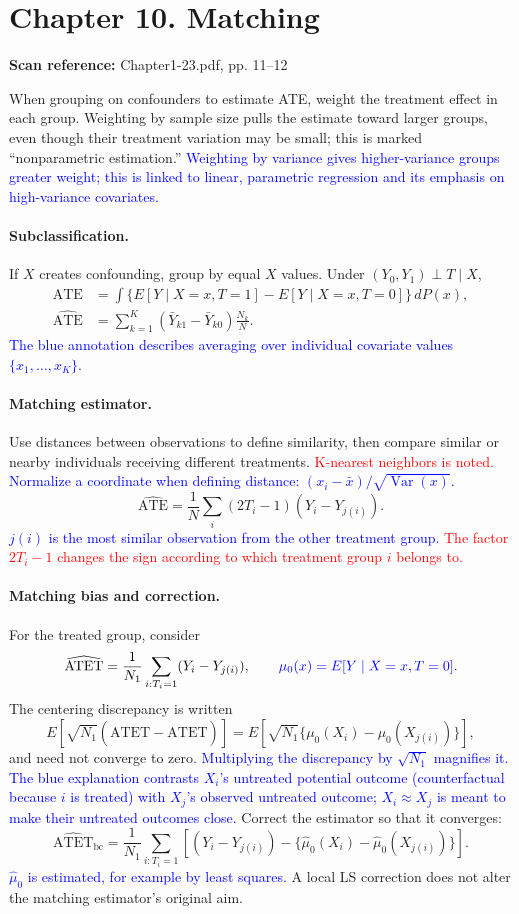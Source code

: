 \documentclass[11pt,a4paper]{article}
\newcommand{\sourcepages}[1]{\par{\small\sffamily\color{muted}\textbf{Scan reference:} #1\par}\nobreak\smallskip\nopagebreak[4]}
\newcommand{\inkblue}[1]{\textcolor{blue}{#1}}
\newcommand{\inkred}[1]{\textcolor{red}{#1}}
\begin{document}
{\section{Chapter 10. Matching}
\sourcepages{Chapter1-23.pdf, pp. 11--12}
When grouping on confounders to estimate ATE, weight the treatment effect in each group. Weighting by sample size pulls the estimate toward larger groups, even though their treatment variation may be small; this is marked ``nonparametric estimation.'' \inkblue{Weighting by variance gives higher-variance groups greater weight; this is linked to linear, parametric regression and its emphasis on high-variance covariates.}

\paragraph{Subclassification.}
If $X$ creates confounding, group by equal $X$ values. Under $(Y_0,Y_1)\perp T\mid X$,
\begin{align*}
\mathrm{ATE}&=\int\{E[Y\mid X=x,T=1]-E[Y\mid X=x,T=0]\}\,dP(x),\\
\widehat{\mathrm{ATE}}&=\sum_{k=1}^{K}(\bar Y_{k1}-\bar Y_{k0})\frac{N_k}{N}.
\end{align*}
\inkblue{The blue annotation describes averaging over individual covariate values $\{x_1,\ldots,x_K\}$.}

\paragraph{Matching estimator.}
Use distances between observations to define similarity, then compare similar or nearby individuals receiving different treatments. \inkred{K-nearest neighbors is noted.} \inkblue{Normalize a coordinate when defining distance: $(x_i-\bar x)/\sqrt{\operatorname{Var}(x)}$.}
\[\widehat{\mathrm{ATE}}=\frac1N\sum_i(2T_i-1)(Y_i-Y_{j(i)}).\]
\inkblue{$j(i)$ is the most similar observation from the other treatment group.} \inkred{The factor $2T_i-1$ changes the sign according to which treatment group $i$ belongs to.}

\paragraph{Matching bias and correction.}
For the treated group, consider
\[\widehat{\mathrm{ATET}}=\frac1{N_1}\sum_{i:T_i=1}(Y_i-Y_{j(i)}),\qquad
\inkblue{\mu_0(x)=E[Y\mid X=x,T=0]}.\]
The centering discrepancy is written
\[E[\sqrt{N_1}(\widehat{\mathrm{ATET}}-\mathrm{ATET})]
=E[\sqrt{N_1}\{\mu_0(X_i)-\mu_0(X_{j(i)})\}],\]
and need not converge to zero. \inkblue{Multiplying the discrepancy by $\sqrt{N_1}$ magnifies it.} \inkblue{The blue explanation contrasts $X_i$'s untreated potential outcome (counterfactual because $i$ is treated) with $X_j$'s observed untreated outcome; $X_i\approx X_j$ is meant to make their untreated outcomes close.} Correct the estimator so that it converges:
\[\widehat{\mathrm{ATET}}_{\mathrm{bc}}=
\frac1{N_1}\sum_{i:T_i=1}\left[(Y_i-Y_{j(i)})-
\{\hat\mu_0(X_i)-\hat\mu_0(X_{j(i)})\}\right].\]
\inkblue{$\hat\mu_0$ is estimated, for example by least squares.} A local LS correction does not alter the matching estimator's original aim.

}
\end{document}
